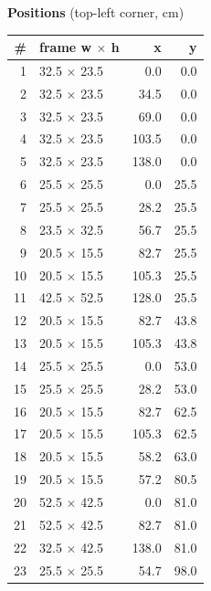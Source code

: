 \documentclass[a4paper,landscape,10pt]{article}
\begin{document}
\begin{minipage}[t]{0.25\textwidth}
\vspace{8pt}
{\bfseries Positions} (top-left corner, cm)\\[2pt]
\tiny
\begin{tabular}{@{}r l r r@{}}
\toprule
\# & frame w $\times$ h & x & y \\
\midrule
1 & 32.5 $\times$ 23.5 & 0.0 & 0.0 \\
2 & 32.5 $\times$ 23.5 & 34.5 & 0.0 \\
3 & 32.5 $\times$ 23.5 & 69.0 & 0.0 \\
4 & 32.5 $\times$ 23.5 & 103.5 & 0.0 \\
5 & 32.5 $\times$ 23.5 & 138.0 & 0.0 \\
6 & 25.5 $\times$ 25.5 & 0.0 & 25.5 \\
7 & 25.5 $\times$ 25.5 & 28.2 & 25.5 \\
8 & 23.5 $\times$ 32.5 & 56.7 & 25.5 \\
9 & 20.5 $\times$ 15.5 & 82.7 & 25.5 \\
10 & 20.5 $\times$ 15.5 & 105.3 & 25.5 \\
11 & 42.5 $\times$ 52.5 & 128.0 & 25.5 \\
12 & 20.5 $\times$ 15.5 & 82.7 & 43.8 \\
13 & 20.5 $\times$ 15.5 & 105.3 & 43.8 \\
14 & 25.5 $\times$ 25.5 & 0.0 & 53.0 \\
15 & 25.5 $\times$ 25.5 & 28.2 & 53.0 \\
16 & 20.5 $\times$ 15.5 & 82.7 & 62.5 \\
17 & 20.5 $\times$ 15.5 & 105.3 & 62.5 \\
18 & 20.5 $\times$ 15.5 & 58.2 & 63.0 \\
19 & 20.5 $\times$ 15.5 & 57.2 & 80.5 \\
20 & 52.5 $\times$ 42.5 & 0.0 & 81.0 \\
21 & 52.5 $\times$ 42.5 & 82.7 & 81.0 \\
22 & 32.5 $\times$ 42.5 & 138.0 & 81.0 \\
23 & 25.5 $\times$ 25.5 & 54.7 & 98.0 \\
\bottomrule
\end{tabular}
\end{minipage}
\clearpage
\end{document}
